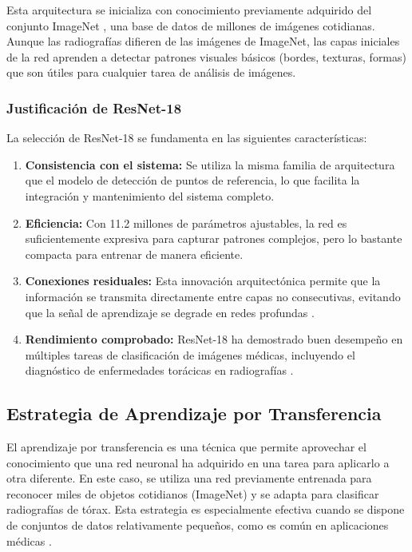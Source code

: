Esta arquitectura se inicializa con conocimiento previamente adquirido del conjunto ImageNet \cite{deng2009imagenet}, una base de datos de millones de imágenes cotidianas. Aunque las radiografías difieren de las imágenes de ImageNet, las capas iniciales de la red aprenden a detectar patrones visuales básicos (bordes, texturas, formas) que son útiles para cualquier tarea de análisis de imágenes.

\subsubsection{Justificación de ResNet-18}

La selección de ResNet-18 se fundamenta en las siguientes características:

\begin{enumerate}
    \item \textbf{Consistencia con el sistema:} Se utiliza la misma familia de arquitectura que el modelo de detección de puntos de referencia, lo que facilita la integración y mantenimiento del sistema completo.

    \item \textbf{Eficiencia:} Con 11.2 millones de parámetros ajustables, la red es suficientemente expresiva para capturar patrones complejos, pero lo bastante compacta para entrenar de manera eficiente.

    \item \textbf{Conexiones residuales:} Esta innovación arquitectónica permite que la información se transmita directamente entre capas no consecutivas, evitando que la señal de aprendizaje se degrade en redes profundas \cite{he2016deep}.

    \item \textbf{Rendimiento comprobado:} ResNet-18 ha demostrado buen desempeño en múltiples tareas de clasificación de imágenes médicas, incluyendo el diagnóstico de enfermedades torácicas en radiografías \cite{rajpurkar2017chexnet}.
\end{enumerate}

\subsection{Estrategia de Aprendizaje por Transferencia}
\label{subsec:transfer_learning_clasificacion}

El aprendizaje por transferencia es una técnica que permite aprovechar el conocimiento que una red neuronal ha adquirido en una tarea para aplicarlo a otra diferente. En este caso, se utiliza una red previamente entrenada para reconocer miles de objetos cotidianos (ImageNet) y se adapta para clasificar radiografías de tórax. Esta estrategia es especialmente efectiva cuando se dispone de conjuntos de datos relativamente pequeños, como es común en aplicaciones médicas \cite{raghu2019transfusion}.


